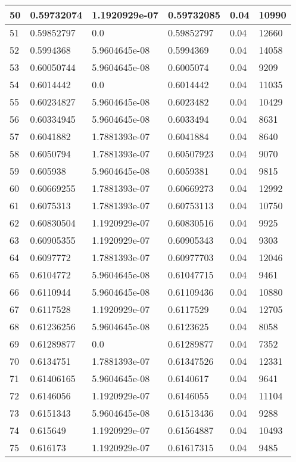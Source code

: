 \begin{longtable}{|l|l|l|l|l|l|}
50 & 0.59732074 & 1.1920929e-07 & 0.59732085 & 0.04 & 10990 \\ \hline 
51 & 0.59852797 & 0.0 & 0.59852797 & 0.04 & 12660 \\ \hline 
52 & 0.5994368 & 5.9604645e-08 & 0.5994369 & 0.04 & 14058 \\ \hline 
53 & 0.60050744 & 5.9604645e-08 & 0.6005074 & 0.04 & 9209 \\ \hline 
54 & 0.6014442 & 0.0 & 0.6014442 & 0.04 & 11035 \\ \hline 
55 & 0.60234827 & 5.9604645e-08 & 0.6023482 & 0.04 & 10429 \\ \hline 
56 & 0.60334945 & 5.9604645e-08 & 0.6033494 & 0.04 & 8631 \\ \hline 
57 & 0.6041882 & 1.7881393e-07 & 0.6041884 & 0.04 & 8640 \\ \hline 
58 & 0.6050794 & 1.7881393e-07 & 0.60507923 & 0.04 & 9070 \\ \hline 
59 & 0.605938 & 5.9604645e-08 & 0.6059381 & 0.04 & 9815 \\ \hline 
60 & 0.60669255 & 1.7881393e-07 & 0.60669273 & 0.04 & 12992 \\ \hline 
61 & 0.6075313 & 1.7881393e-07 & 0.60753113 & 0.04 & 10750 \\ \hline 
62 & 0.60830504 & 1.1920929e-07 & 0.60830516 & 0.04 & 9925 \\ \hline 
63 & 0.60905355 & 1.1920929e-07 & 0.60905343 & 0.04 & 9303 \\ \hline 
64 & 0.6097772 & 1.7881393e-07 & 0.60977703 & 0.04 & 12046 \\ \hline 
65 & 0.6104772 & 5.9604645e-08 & 0.61047715 & 0.04 & 9461 \\ \hline 
66 & 0.6110944 & 5.9604645e-08 & 0.61109436 & 0.04 & 10880 \\ \hline 
67 & 0.6117528 & 1.1920929e-07 & 0.6117529 & 0.04 & 12705 \\ \hline 
68 & 0.61236256 & 5.9604645e-08 & 0.6123625 & 0.04 & 8058 \\ \hline 
69 & 0.61289877 & 0.0 & 0.61289877 & 0.04 & 7352 \\ \hline 
70 & 0.6134751 & 1.7881393e-07 & 0.61347526 & 0.04 & 12331 \\ \hline 
71 & 0.61406165 & 5.9604645e-08 & 0.6140617 & 0.04 & 9641 \\ \hline 
72 & 0.6146056 & 1.1920929e-07 & 0.6146055 & 0.04 & 11104 \\ \hline 
73 & 0.6151343 & 5.9604645e-08 & 0.61513436 & 0.04 & 9288 \\ \hline 
74 & 0.615649 & 1.1920929e-07 & 0.61564887 & 0.04 & 10493 \\ \hline 
75 & 0.616173 & 1.1920929e-07 & 0.61617315 & 0.04 & 9485 \\ \hline 
\end{longtable}